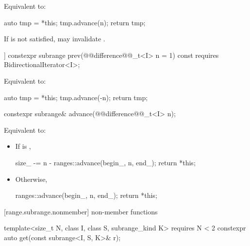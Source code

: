 {\begin{itemdescr}
\pnum
\effects Equivalent to:
\begin{codeblock}
auto tmp = *this;
tmp.advance(n);
return tmp;
\end{codeblock}

\pnum
\begin{note}
If  is not satisfied, 
may invalidate .
\end{note}
\end{itemdescr}

%
\begin{itemdecl}
[[nodiscard]] constexpr subrange prev(@@difference@@_t<I> n = 1) const
  requires BidirectionalIterator<I>;
\end{itemdecl}

\begin{itemdescr}
\pnum
\effects Equivalent to:
\begin{codeblock}
auto tmp = *this;
tmp.advance(-n);
return tmp;
\end{codeblock}
\end{itemdescr}

%
\begin{itemdecl}
constexpr subrange& advance(@@difference@@_t<I> n);
\end{itemdecl}

\begin{itemdescr}
\pnum
\effects Equivalent to:
\begin{itemize}
\item If  is ,
\begin{codeblock}
size_ -= n - ranges::advance(begin_, n, end_);
return *this;
\end{codeblock}
\item Otherwise,
\begin{codeblock}
ranges::advance(begin_, n, end_);
return *this;
\end{codeblock}
\end{itemize}
\end{itemdescr}

[range.subrange.nonmember]{ non-member functions}

%
\begin{itemdecl}
template<size_t N, class I, class S, subrange_kind K>
  requires N < 2
constexpr auto get(const subrange<I, S, K>& r);
\end{itemdecl}

}
